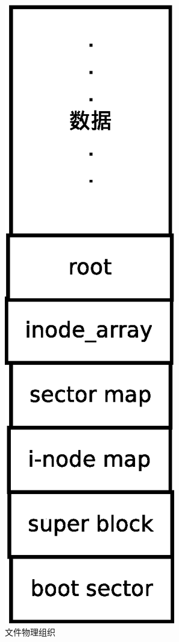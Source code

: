 \documentclass[UTF8,nofonts,cs4size]{ctexrep}
\begin{document}
\begin{figure}[htp]
\centering
\includegraphics[scale=0.4]{file.eps}
\caption{文件物理组织}
\label{file}
\end{figure}
\\ \indent
\end{document}
